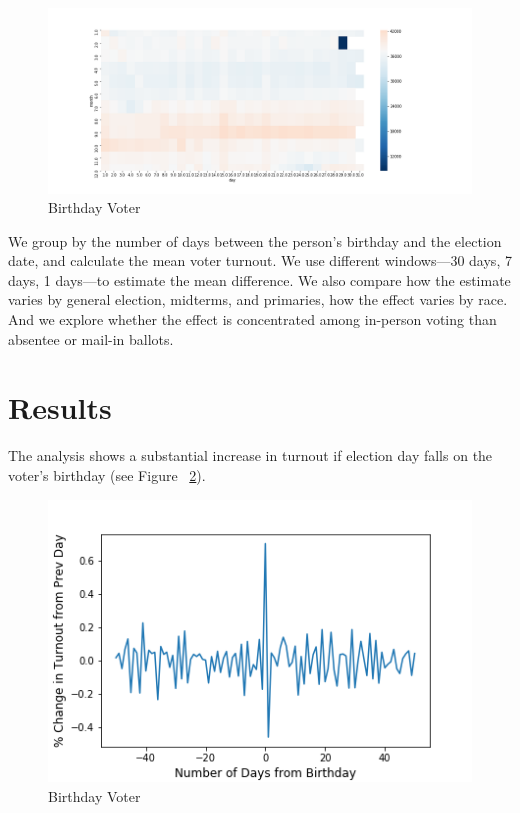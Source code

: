 \documentclass[12pt, letterpaper]{article}
\begin{document}
\begin{figure}[H]
\centering
 \includegraphics[width=\textwidth]{../figs/fig2_bday_count_by_month_day.png}
 \caption{Birthday Voter}
 \label{fig:birthday}
\end{figure}

We group by the number of days between the person's birthday and the election date, and calculate the mean voter turnout. We use different windows---30 days, 7 days, 1 days---to estimate the mean difference. We also compare how the estimate varies by general election, midterms, and primaries, how the effect varies by race. And we explore whether the effect is concentrated among in-person voting than absentee or mail-in ballots.

\section{Results}
The analysis shows a substantial increase in turnout if election day falls on the voter's birthday (see Figure ~\ref{fig:birthday}).

\begin{figure}[H]
\centering
 \includegraphics[scale=.7]{../figs/fig1_turnout_chg_from_prev_day.png}
 \caption{Birthday Voter}
 \label{fig:birthday}
\end{figure}
\end{document}
